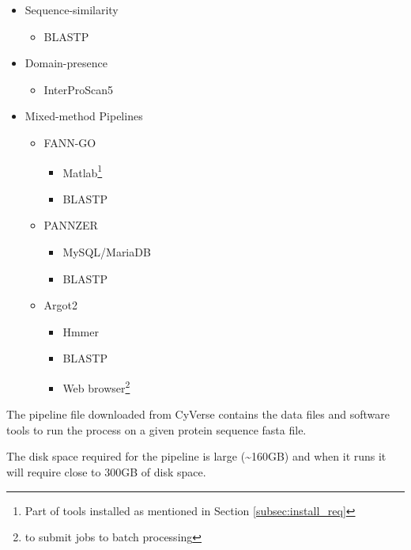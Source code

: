 \begin{itemize}
    \item Sequence-similarity
        \begin{itemize}
            \item BLASTP
        \end{itemize}
    \item Domain-presence
        \begin{itemize}
            \item InterProScan5
        \end{itemize}
    \item Mixed-method Pipelines
    \begin{itemize}
        \item FANN-GO
        \begin{itemize}
            \item Matlab\footnote[1]{Part of tools installed as mentioned in Section \ref{subsec:install_req}}
            \item BLASTP
        \end{itemize}
        \item PANNZER
        \begin{itemize}
            \item MySQL/MariaDB\footnotemark[1]
            \item BLASTP
        \end{itemize}
        \item Argot2
        \begin{itemize}
            \item Hmmer
            \item BLASTP
            \item Web browser\footnotemark[1] \footnote[2]{to submit jobs to batch processing}
        \end{itemize}
    \end{itemize}
\end{itemize}

The pipeline file downloaded from CyVerse contains the data files and software tools to run the process on a given protein sequence fasta file.

The disk space required for the pipeline is large (\textasciitilde{}160GB) and when it runs it will require close to 300GB of disk space.